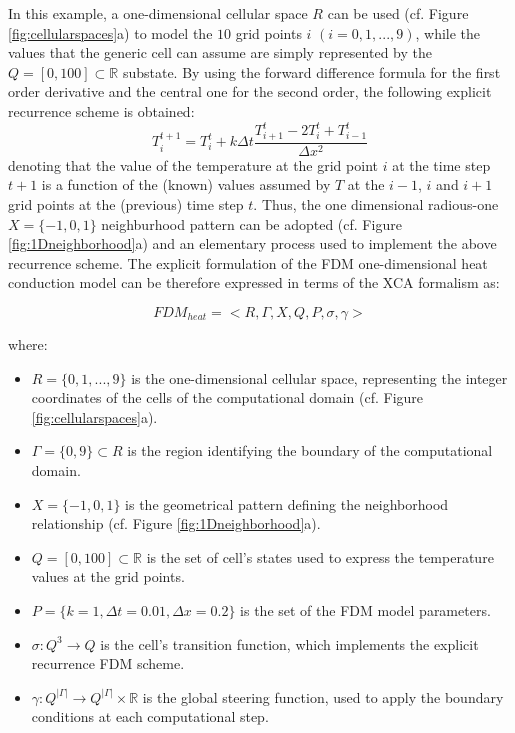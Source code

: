         In this example, a one-dimensional cellular space $R$
    can be used (cf. Figure \ref{fig:cellularspaces}a) to model the
    $10$ grid points $i$ $(i = 0, 1, ...,9)$, while the values that
    the generic cell can assume are simply represented by the $Q = [0,
      100] \subset \mathbb{R}$ substate. By using the forward
    difference formula for the first order derivative and the central
    one for the second order, the following explicit recurrence scheme
    is obtained:
    $$ T_i^{t+1} = T_i^t + k \Delta t \frac{T_{i+1}^t - 2T_i^t +
      T_{i-1}^t}{\Delta x^2}
    $$ denoting that the value of the temperature at the grid point
    $i$ at the time step $t+1$ is a function of the (known) values
    assumed by $T$ at the $i-1$, $i$ and $i+1$ grid points at the
    (previous) time step $t$. Thus, the one dimensional radious-one $X
    = \{-1, 0, 1\}$ neighburhood pattern can be adopted (cf. Figure
    \ref{fig:1Dneighborhood}a) and an elementary process used to
    implement the above recurrence scheme. The explicit formulation of
    the FDM one-dimensional heat conduction model can be therefore
    expressed in terms of the XCA formalism as:

    $$ FDM_{heat} = <R,\Gamma,X,Q,P,\sigma,\gamma>$$

    \noindent where:

    \begin{itemize}

    \item $R = \{0,1,...,9\}$ is the one-dimensional cellular space,
      representing the integer coordinates of the cells of the
      computational domain (cf. Figure \ref{fig:cellularspaces}a).

    \item $\Gamma = \{0, 9\} \subset R$ is the region identifying the
      boundary of the computational domain.


    \item $X = \{-1, 0, 1\}$ is the geometrical pattern defining the
      neighborhood relationship (cf. Figure
      \ref{fig:1Dneighborhood}a).

    \item $Q = [0, 100] \subset \mathbb{R}$ is the set of cell's
      states used to express the temperature values at the grid
      points.

    \item $P = \{k = 1, \Delta t = 0.01, \Delta x = 0.2\}$ is the set
      of the FDM model parameters.
      
    \item $\sigma : Q^3 \rightarrow Q$ is the cell's transition
      function, which implements the explicit recurrence FDM scheme.

    \item $\gamma: Q^{|\Gamma|} \rightarrow Q^{|\Gamma|} \times
      \mathbb{R}$ is the global steering function, used to apply the
      boundary conditions at each computational step.

    \end{itemize}

